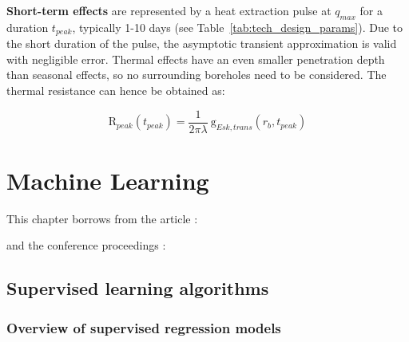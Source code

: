 \textbf{Short-term effects} are represented by a heat extraction pulse at $q_{max}$ for a duration $t_{peak}$, typically 1-10 days (see Table~\ref{tab:tech_design_params}). Due to the short duration of the pulse, the asymptotic transient approximation is valid with negligible error. Thermal effects have an even smaller penetration depth than seasonal effects, so no surrounding boreholes need to be considered. The thermal resistance can hence be obtained as:

\begin{equation}
    \mathrm{R}_{peak}(t_{peak}) = \frac{1}{2 \pi \lambda} \ \mathrm{g}_{Esk, trans}(r_b, t_{peak})
\end{equation}



\cleardoublepage
\chapter{Machine Learning}
\label{methods_ML}

\vspace{-45pt} %
\begin{tcolorbox}[enhanced,width=\textwidth,size=fbox,
        sharp corners,colframe=black!5!white,drop fuzzy shadow southeast,
        boxrule=3mm, parbox=false] 
        
This chapter borrows from the article \citep{walch_big_2020}:

\qquad {}

and the conference proceedings \cite{walch_spatio-temporal_2019, walch_fast_2019-1}:

\quad {} 

\quad {}
\end{tcolorbox}

\section{Supervised learning algorithms}
\label{ML_supervised}

\subsection{Overview of supervised regression models}

